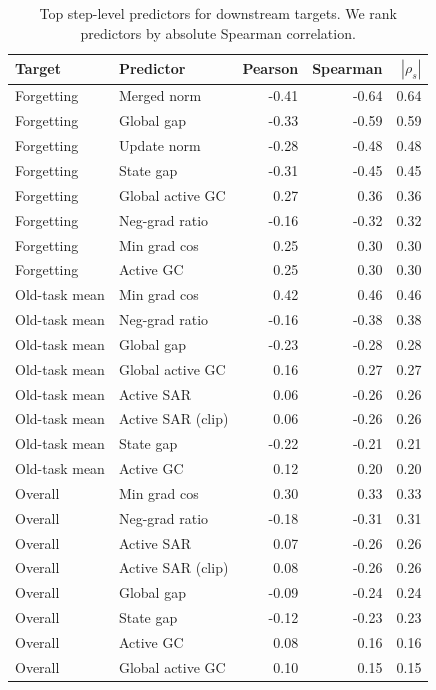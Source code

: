 \documentclass{article}
\begin{document}
\begin{table}[!htbp]
  \centering
  \caption{
  {Top step-level predictors for downstream targets.}
  We rank predictors by absolute Spearman correlation.
  }
  \label{tab:app_step_explanation_top}
  \scriptsize
  \setlength{\tabcolsep}{4pt}
{
\renewcommand{\arraystretch}{1.06}
\begin{tabular}{llrrr}
\toprule[0.9pt]
\rowcolor{sizeBand}
Target & Predictor & Pearson & Spearman & $|\rho_s|$ \\
\midrule
\rowcolor{rcwmBlue} Forgetting & Merged norm & -0.41 & -0.64 & 0.64 \\
\rowcolor{rcwmBlue} Forgetting & Global gap & -0.33 & -0.59 & 0.59 \\
\rowcolor{rcwmBlue} Forgetting & Update norm & -0.28 & -0.48 & 0.48 \\
\rowcolor{rcwmBlue} Forgetting & State gap & -0.31 & -0.45 & 0.45 \\
\rowcolor{rcwmBlue} Forgetting & Global active GC & 0.27 & 0.36 & 0.36 \\
\rowcolor{rcwmBlue} Forgetting & Neg-grad ratio & -0.16 & -0.32 & 0.32 \\
\rowcolor{rcwmBlue} Forgetting & Min grad cos & 0.25 & 0.30 & 0.30 \\
\rowcolor{rcwmBlue} Forgetting & Active GC & 0.25 & 0.30 & 0.30 \\
\midrule
\rowcolor{mergeBlue} Old-task mean & Min grad cos & 0.42 & 0.46 & 0.46 \\
\rowcolor{mergeBlue} Old-task mean & Neg-grad ratio & -0.16 & -0.38 & 0.38 \\
\rowcolor{mergeBlue} Old-task mean & Global gap & -0.23 & -0.28 & 0.28 \\
\rowcolor{mergeBlue} Old-task mean & Global active GC & 0.16 & 0.27 & 0.27 \\
\rowcolor{mergeBlue} Old-task mean & Active SAR & 0.06 & -0.26 & 0.26 \\
\rowcolor{mergeBlue} Old-task mean & Active SAR (clip) & 0.06 & -0.26 & 0.26 \\
\rowcolor{mergeBlue} Old-task mean & State gap & -0.22 & -0.21 & 0.21 \\
\rowcolor{mergeBlue} Old-task mean & Active GC & 0.12 & 0.20 & 0.20 \\
\midrule
\rowcolor{refGray} Overall & Min grad cos & 0.30 & 0.33 & 0.33 \\
\rowcolor{refGray} Overall & Neg-grad ratio & -0.18 & -0.31 & 0.31 \\
\rowcolor{refGray} Overall & Active SAR & 0.07 & -0.26 & 0.26 \\
\rowcolor{refGray} Overall & Active SAR (clip) & 0.08 & -0.26 & 0.26 \\
\rowcolor{refGray} Overall & Global gap & -0.09 & -0.24 & 0.24 \\
\rowcolor{refGray} Overall & State gap & -0.12 & -0.23 & 0.23 \\
\rowcolor{refGray} Overall & Active GC & 0.08 & 0.16 & 0.16 \\
\rowcolor{refGray} Overall & Global active GC & 0.10 & 0.15 & 0.15 \\
\bottomrule[0.9pt]
\end{tabular}
}


\end{table}
\end{document}
